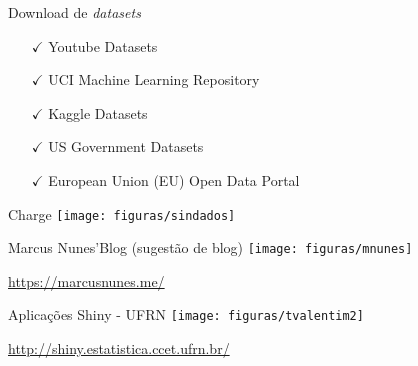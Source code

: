 \documentclass[xcolor=table,t]{beamer}
\begin{document}
\begin{frame}[c]{Download de \textit{datasets}}
\begin{itemize}
\justifying
\item[$\checkmark$] \normalsize{Youtube Datasets} \newline
\href{https://research.google.com/youtube8m/}{}
\vspace{0.1 cm}
\item[$\checkmark$] \normalsize{UCI Machine Learning Repository} \newline
\href{https://archive.ics.uci.edu/ml/datasets.php}{}
\vspace{0.1 cm}
\item[$\checkmark$] \normalsize{Kaggle Datasets} \newline
\href{http://kaggle.com/}{}
\vspace{0.1 cm}
\item[$\checkmark$] \normalsize{US Government Datasets} \newline
\href{http://catalog.data.gov/dataset}{}
\vspace{0.1 cm}
\item[$\checkmark$] \normalsize{European Union (EU) Open Data Portal} \newline
\href{http://data.europa.eu/euodp/en/data/}{}
\end{itemize}
\end{frame}

\begin{frame}[c]{Charge}
\centering
\texttt{[image: figuras/sindados]}
\end{frame}

\begin{frame}[c]{Marcus Nunes'Blog (sugestão de blog)}
\centering
\texttt{[image: figuras/mnunes]}
\begin{flushleft}
	\footnotesize
	\href{https://marcusnunes.me/}{https://marcusnunes.me/}
\end{flushleft}
\end{frame}

\begin{frame}[c]{Aplicações Shiny - UFRN}
\centering
\texttt{[image: figuras/tvalentim2]}
\begin{flushleft}
	\footnotesize
	\href{http://shiny.estatistica.ccet.ufrn.br/}{http://shiny.estatistica.ccet.ufrn.br/}
\end{flushleft}
\end{frame}
\end{document}
